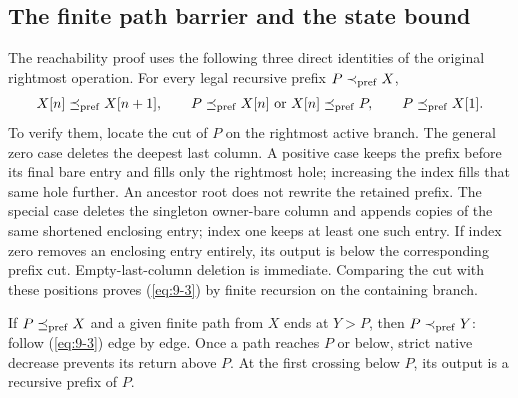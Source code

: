 \subsection{The finite path barrier and the state bound}
\label{sec:path-details}
The reachability proof uses the following three direct identities of
the original rightmost operation. For every legal recursive prefix
$P\prec_{\mathrm{pref}} X$,
\begin{equation}\label{eq:9-3}
 \begin{gathered}
 X[n]\preceq_{\mathrm{pref}} X[n+1],\qquad
 P\preceq_{\mathrm{pref}} X[n]\ \text{or}\ X[n]\preceq_{\mathrm{pref}} P,\qquad
 P\preceq_{\mathrm{pref}} X[1].
 \end{gathered}                                                
\end{equation}
To verify them, locate the cut of $P$ on the rightmost active branch.
The general zero case deletes the deepest last column. A positive
case keeps the prefix before its final bare entry and fills only the
rightmost hole; increasing the index fills that same hole further.
An ancestor root does not rewrite the retained prefix. The special
case deletes the singleton owner-bare column and appends copies of
the same shortened enclosing entry; index one keeps at least one
such entry. If index zero removes an enclosing entry entirely, its
output is below the corresponding prefix cut. Empty-last-column
deletion is immediate. Comparing the cut with these positions proves
(\ref{eq:9-3}) by finite recursion on the containing branch.

If $P\preceq_{\mathrm{pref}} X$ and a given finite path from $X$ ends at $Y>P$, then
$P\prec_{\mathrm{pref}} Y$: follow (\ref{eq:9-3}) edge by edge. Once a path reaches $P$ or
below, strict native decrease prevents its return above $P$. At the
first crossing below $P$, its output is a recursive prefix of $P$.

